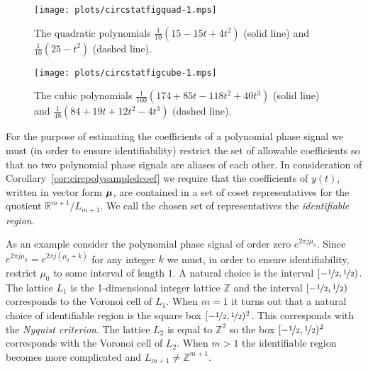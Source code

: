 \documentclass[aap,preprint]{imsart}
\newcommand{\reals}{{\mathbb R}}
\newcommand{\ints}{{\mathbb Z}}
\newcommand{\term}{\emph}
\begin{document}
\begin{figure}[p]
	\centering
		\texttt{[image: plots/circstatfigquad-1.mps]}
		\caption{The quadratic polynomials $\tfrac{1}{10} (15 - 15 t + 4 t^2)$ (solid line) and $\tfrac{1}{10}(25 -  t^2)$  (dashed line).}
		\label{fig:circstatplot_quad}
\end{figure}

\begin{figure}[p]
	\centering
		\texttt{[image: plots/circstatfigcube-1.mps]}
		\caption{The cubic polynomials $\tfrac{1}{160} (174 + 85 t - 118 t^2 + 40 t^3)$ (solid line) and $\tfrac{1}{48} (84 + 19 t + 12 t^2 - 4 t^3)$  (dashed line).}
		\label{fig:circstatplot_cube}
\end{figure}

For the purpose of estimating the coefficients of a polynomial phase signal we must (in order to ensure identifiability) restrict the set of allowable coefficients so that no two polynomial phase signals are aliases of each other. In consideration of Corollary~\ref{cor:circpolysampledcoef} we require that the coefficients of $y(t)$, written in vector form $\boldsymbol{\mu}$, are contained in a set of coset representatives for the quotient $\reals^{m+1}/L_{m+1}$.  We call the chosen set of representatives the \term{identifiable region}.

As an example consider the polynomial phase signal of order zero $e^{2\pi j \mu_0}$.  Since $e^{2\pi j \mu_0} = e^{2\pi j(\mu_0 + k)}$ for any integer $k$ we must, in order to ensure identifiability, restrict $\mu_0$ to some interval of length $1$.  A natural choice is the interval $[-\nicefrac{1}{2}, \nicefrac{1}{2})$. The lattice $L_1$ is the 1-dimensional integer lattice $\ints$ and the interval $[-\nicefrac{1}{2}, \nicefrac{1}{2})$ corresponds to the Voronoi cell of $L_1$. 
When $m=1$ it turns out that a natural choice of identifiable region is the square box $[-\nicefrac{1}{2}, \nicefrac{1}{2})^2$. This corresponds with the \term{Nyquist criterion}.  The lattice $L_2$ is equal to $\ints^2$ so the box $[-\nicefrac{1}{2}, \nicefrac{1}{2})^2$ corresponds with the Voronoi cell of $L_2$.  
When $m > 1$ the identifiable region becomes more complicated and $L_{m+1} \neq \ints^{m+1}$. %
\end{document}
